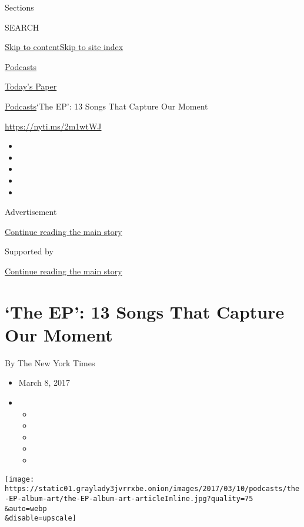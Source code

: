 Sections

SEARCH

\protect\hyperlink{site-content}{Skip to
content}\protect\hyperlink{site-index}{Skip to site index}

\href{https://www.nytimes3xbfgragh.onion/spotlight/podcasts}{Podcasts}

\href{https://myaccount.nytimes3xbfgragh.onion/auth/login?response_type=cookie\&client_id=vi}{}

\href{https://www.nytimes3xbfgragh.onion/section/todayspaper}{Today's
Paper}

\href{/spotlight/podcasts}{Podcasts}\textbar{}`The EP': 13 Songs That
Capture Our Moment

\url{https://nyti.ms/2m1wtWJ}

\begin{itemize}
\item
\item
\item
\item
\item
\end{itemize}

Advertisement

\protect\hyperlink{after-top}{Continue reading the main story}

Supported by

\protect\hyperlink{after-sponsor}{Continue reading the main story}

\hypertarget{the-ep-13-songs-that-capture-our-moment}{%
\section{`The EP': 13 Songs That Capture Our
Moment}\label{the-ep-13-songs-that-capture-our-moment}}

By The New York Times

\begin{itemize}
\item
  March 8, 2017
\item
  \begin{itemize}
  \item
  \item
  \item
  \item
  \item
  \end{itemize}
\end{itemize}

\texttt{[image: https://static01.graylady3jvrrxbe.onion/images/2017/03/10/podcasts/the-EP-album-art/the-EP-album-art-articleInline.jpg?quality=75\\\&auto=webp\\\&disable=upscale]}

